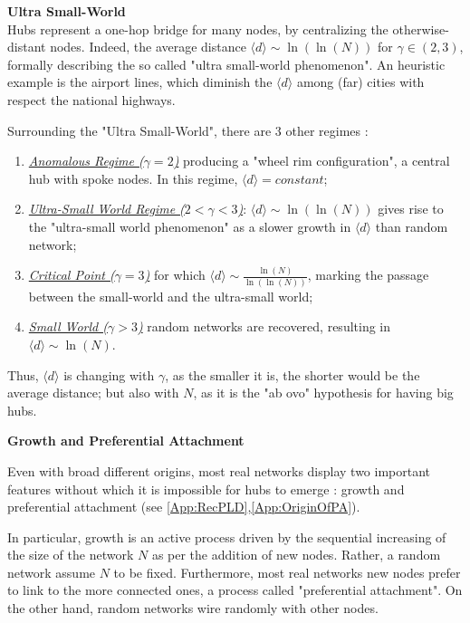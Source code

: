 \documentclass[a4paper,12pt,twoside]{book} %
\theoremstyle{definition}
\begin{document}
{\large \textbf{Ultra Small-World}} \\
Hubs represent a one-hop bridge for many nodes, by centralizing the otherwise-distant nodes. Indeed, the average distance $\langle d \rangle \sim \ln(\ln(N))$ for $\gamma \in (2,3)$, formally describing the so called "ultra small-world phenomenon". An heuristic example is the airport lines, which diminish the \(\langle d \rangle\) among (far) cities with respect the national highways.

Surrounding the "Ultra Small-World", there are $3$ other regimes
\cite{Cohen:2003_SFUSW}:
\begin{enumerate}
	\item \underline{\textit{Anomalous Regime ($\gamma = 2$)}} producing a "wheel rim configuration", 
	a central hub with spoke nodes. In this regime, $\langle d \rangle = constant$;
	\item \underline{\textit{Ultra-Small World Regime ($2 < \gamma < 3$)}}: $\langle d \rangle \sim \ln(\ln(N))$ gives rise to the "ultra-small world phenomenon" as a slower growth in $\langle d \rangle$ than random network;
	\item \underline{\textit{Critical Point ($\gamma = 3$)}} for which $\langle d \rangle \sim \frac{\ln(N)}{\ln(\ln(N))}$, marking the passage between the small-world and the ultra-small world;
	\item \underline{\textit{Small World ($\gamma > 3$)}} random networks are recovered, resulting in $\langle d \rangle \sim \ln(N)$.
\end{enumerate}
Thus, \(\langle d \rangle\) is changing with $\gamma$, as the smaller it is, the shorter would be the average distance; but also with $N$, as it is the "ab ovo" hypothesis for having big hubs.

{\large \textbf{Growth and Preferential Attachment}} 

Even with broad different origins, most real networks display two important features without which it is impossible for hubs to emerge \cite{barabasi::2016networkbook}: growth and preferential attachment (see \autoref{App:RecPLD},\autoref{App:OriginOfPA}). 

In particular, growth is an active process driven by the sequential increasing of the size of the network $N$ as per the addition of new nodes. Rather, a random network assume $N$ to be fixed. \newline
Furthermore, most real networks new nodes prefer to link to the more connected ones, a process called "preferential attachment". On the other hand, random networks wire randomly with other nodes.
\end{document}
